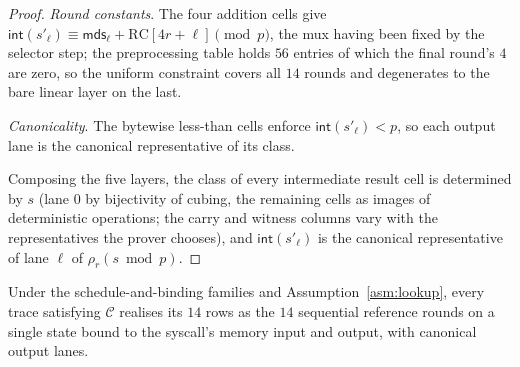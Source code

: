 \begin{proof}
\emph{Round constants}. The four addition cells give $\mathsf{int}(s'_\ell) \equiv \mathsf{mds}_\ell + \mathrm{RC}[4r{+}\ell] \pmod{p}$, the mux having been fixed by the selector step; the preprocessing table holds $56$ entries of which the final round's $4$ are zero, so the uniform constraint covers all $14$ rounds and degenerates to the bare linear layer on the last.

\emph{Canonicality}. The bytewise less-than cells enforce $\mathsf{int}(s'_\ell) < p$, so each output lane is the canonical representative of its class.

Composing the five layers, the class of every intermediate result cell is determined by $s$ (lane $0$ by bijectivity of cubing, the remaining cells as images of deterministic operations; the carry and witness columns vary with the representatives the prover chooses), and $\mathsf{int}(s'_\ell)$ is the canonical representative of lane $\ell$ of $\rho_r(s \bmod p)$.
\end{proof}

\begin{lemma}\label{lem:compose}
Under the schedule-and-binding families and Assumption~\ref{asm:lookup}, every trace satisfying $\mathcal{C}$ realises its $14$ rows as the $14$ sequential reference rounds on a single state bound to the syscall's memory input and output, with canonical output lanes.
\end{lemma}

